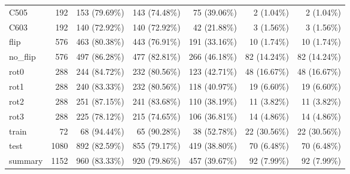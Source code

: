 \begin{longtable}{>{\raggedright\arraybackslash}p{5cm}rrrrrr}
C505 & 192 & 153 (79.69\%) & 143 (74.48\%) & 75 (39.06\%) & 2 (1.04\%) & 2 (1.04\%) \\
C603 & 192 & 140 (72.92\%) & 140 (72.92\%) & 42 (21.88\%) & 3 (1.56\%) & 3 (1.56\%) \\
flip & 576 & 463 (80.38\%) & 443 (76.91\%) & 191 (33.16\%) & 10 (1.74\%) & 10 (1.74\%) \\
no\_flip & 576 & 497 (86.28\%) & 477 (82.81\%) & 266 (46.18\%) & 82 (14.24\%) & 82 (14.24\%) \\
rot0 & 288 & 244 (84.72\%) & 232 (80.56\%) & 123 (42.71\%) & 48 (16.67\%) & 48 (16.67\%) \\
rot1 & 288 & 240 (83.33\%) & 232 (80.56\%) & 118 (40.97\%) & 19 (6.60\%) & 19 (6.60\%) \\
rot2 & 288 & 251 (87.15\%) & 241 (83.68\%) & 110 (38.19\%) & 11 (3.82\%) & 11 (3.82\%) \\
rot3 & 288 & 225 (78.12\%) & 215 (74.65\%) & 106 (36.81\%) & 14 (4.86\%) & 14 (4.86\%) \\
train & 72 & 68 (94.44\%) & 65 (90.28\%) & 38 (52.78\%) & 22 (30.56\%) & 22 (30.56\%) \\
test & 1080 & 892 (82.59\%) & 855 (79.17\%) & 419 (38.80\%) & 70 (6.48\%) & 70 (6.48\%) \\
summary & 1152 & 960 (83.33\%) & 920 (79.86\%) & 457 (39.67\%) & 92 (7.99\%) & 92 (7.99\%) \\
\end{longtable}
